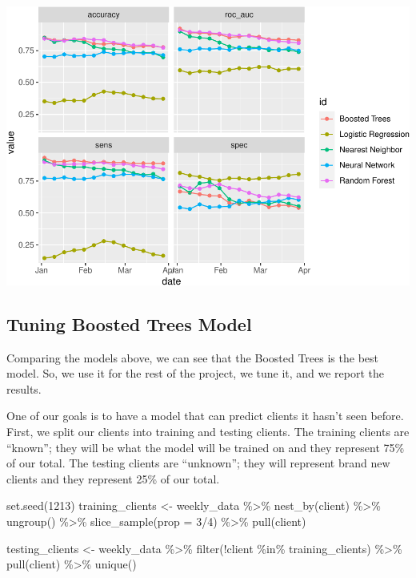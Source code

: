 \documentclass[
]{article}
\newenvironment{Shaded}{\begin{snugshade}}{\end{snugshade}}
\newcommand{\AttributeTok}[1]{\textcolor[rgb]{0.77,0.63,0.00}{#1}}
\newcommand{\DecValTok}[1]{\textcolor[rgb]{0.00,0.00,0.81}{#1}}
\newcommand{\FunctionTok}[1]{\textcolor[rgb]{0.00,0.00,0.00}{#1}}
\newcommand{\NormalTok}[1]{#1}
\newcommand{\OtherTok}[1]{\textcolor[rgb]{0.56,0.35,0.01}{#1}}
\newcommand{\SpecialCharTok}[1]{\textcolor[rgb]{0.00,0.00,0.00}{#1}}
\begin{document}
\includegraphics{figures/report/fig-unnamed-chunk-47-1.pdf}

\hypertarget{tuning-boosted-trees-model}{%
\subsection{Tuning Boosted Trees
Model}\label{tuning-boosted-trees-model}}

Comparing the models above, we can see that the Boosted Trees is the
best model. So, we use it for the rest of the project, we tune it, and
we report the results.

One of our goals is to have a model that can predict clients it hasn't
seen before. First, we split our clients into training and testing
clients. The training clients are ``known''; they will be what the model
will be trained on and they represent 75\% of our total. The testing
clients are ``unknown''; they will represent brand new clients and they
represent 25\% of our total.

\begin{Shaded}
\begin{Highlighting}[]
\FunctionTok{set.seed}\NormalTok{(}\DecValTok{1213}\NormalTok{)}
\NormalTok{training\_clients }\OtherTok{\textless{}{-}}
\NormalTok{  weekly\_data }\SpecialCharTok{\%\textgreater{}\%}
  \FunctionTok{nest\_by}\NormalTok{(client) }\SpecialCharTok{\%\textgreater{}\%}
  \FunctionTok{ungroup}\NormalTok{() }\SpecialCharTok{\%\textgreater{}\%}
  \FunctionTok{slice\_sample}\NormalTok{(}\AttributeTok{prop =} \DecValTok{3}\SpecialCharTok{/}\DecValTok{4}\NormalTok{) }\SpecialCharTok{\%\textgreater{}\%}
  \FunctionTok{pull}\NormalTok{(client)}

\NormalTok{testing\_clients }\OtherTok{\textless{}{-}}
\NormalTok{  weekly\_data }\SpecialCharTok{\%\textgreater{}\%}
  \FunctionTok{filter}\NormalTok{(}\SpecialCharTok{!}\NormalTok{client }\SpecialCharTok{\%in\%}\NormalTok{ training\_clients) }\SpecialCharTok{\%\textgreater{}\%}
  \FunctionTok{pull}\NormalTok{(client) }\SpecialCharTok{\%\textgreater{}\%}
  \FunctionTok{unique}\NormalTok{()}
\end{Highlighting}
\end{Shaded}
\end{document}
